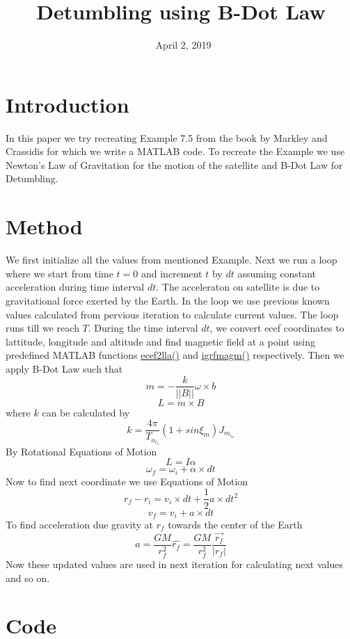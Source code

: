 \documentclass[11pt]{article}
\begin{document}
\title{Detumbling using B-Dot Law}
\date{\ April 2, 2019}
\maketitle

\section{Introduction}
In this paper we try recreating Example 7.5 from the book by Markley and Crassidis for which we write a MATLAB code. To recreate the Example we use Newton's Law of Gravitation for the motion of the satellite and B-Dot Law for Detumbling.

\section{Method}
We first initialize all the values from mentioned Example. Next we run a loop where we start from time $t=0$ and increment $t$ by $dt$ assuming constant acceleration during time interval $dt$. The acceleraton on satellite is due to gravitational force exerted by the Earth. In the loop we use previous known values calculated from pervious iteration to calculate current values. The loop runs till we reach $T$. During the time interval $dt$, we convert ecef coordinates to lattitude, longitude and altitude and find magnetic field at a point using predefined MATLAB functions \href{https://in.mathworks.com/help/aerotbx/ug/ecef2lla.html}{ecef2lla()} and \href{https://in.mathworks.com/help/aerotbx/ug/igrfmagm.html}{igrfmagm()} respectively.
\linebreak\linebreak
Then we apply B-Dot Law such that
$$m=-\frac{k}{||B||} \omega\times b$$
$$L=m\times B$$
where $k$ can be calculated by 
$$k=\frac{4\pi}{T_o_r_b}(1+sin\xi_m)J_m_i_n$$
By Rotational Equations of Motion 
$$L=I\alpha$$
$$\omega_f=\omega_i+\alpha\times dt$$
Now to find next coordinate we use Equations of Motion
$$r_f-r_i=v_i\times dt+\frac{1}{2}a\times dt^2$$
$$v_f=v_i+a\times dt$$
To find acceleration due gravity at $r_f$ towards the center of the Earth
$$a=\frac{GM}{r_f^2}\hat{r_f}=\frac{GM}{r_f^2}\frac{\vec{r_f}}{|r_f|}$$
Now these updated values are used in next iteration for calculating next values and so on.

\section{Code}
\end{document}

